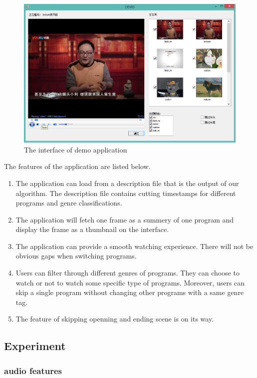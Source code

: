 \documentclass{article}
\begin{document}
  \begin{figure}
    \centering \includegraphics[width=\textwidth]{img/demo.png}
    \caption{The interface of demo application}
  \end{figure}

  The features of the application are listed below.

  \begin{enumerate}
  \item The application can load from a description file that is the output of our algorithm. The description file contains cutting timestamps for different programs and genre classifications.
  \item The application will fetch one frame as a summery of one program and display the frame as a thumbnail on the interface.
  \item The application can provide a smooth watching experience. There will not be obvious gaps when switching programs. 
  \item Users can filter through different genres of programs. They can choose to watch or not to watch some specific type of programs. Moreover, users can skip a single program without changing other programs with a same genre tag.
  \item The feature of skipping openning and ending scene is on its way.
  \end{enumerate}

\subsection{Experiment}

\subsubsection{audio features}
\end{document}
